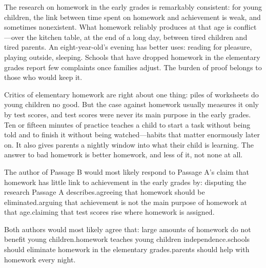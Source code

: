 \documentclass[11pt]{article}
\begin{document}
\begin{passage}
The research on homework in the early grades is remarkably consistent: for young children, the link between time spent on homework and achievement is weak, and sometimes nonexistent. What homework reliably produces at that age is conflict---over the kitchen table, at the end of a long day, between tired children and tired parents. An eight-year-old's evening has better uses: reading for pleasure, playing outside, sleeping. Schools that have dropped homework in the elementary grades report few complaints once families adjust. The burden of proof belongs to those who would keep it.
\end{passage}
\begin{passage}[cont]
Critics of elementary homework are right about one thing: piles of worksheets do young children no good. But the case against homework usually measures it only by test scores, and test scores were never its main purpose in the early grades. Ten or fifteen minutes of practice teaches a child to start a task without being told and to finish it without being watched---habits that matter enormously later on. It also gives parents a nightly window into what their child is learning. The answer to bad homework is better homework, and less of it, not none at all.
\end{passage}

{The author of Passage B would most likely respond to Passage A's claim that homework has little link to achievement in the early grades by:}
{disputing the research Passage A describes.}{agreeing that homework should be eliminated.}{arguing that achievement is not the main purpose of homework at that age.}{claiming that test scores rise where homework is assigned.}

{Both authors would most likely agree that:}
{large amounts of homework do not benefit young children.}{homework teaches young children independence.}{schools should eliminate homework in the elementary grades.}{parents should help with homework every night.}
\end{document}
